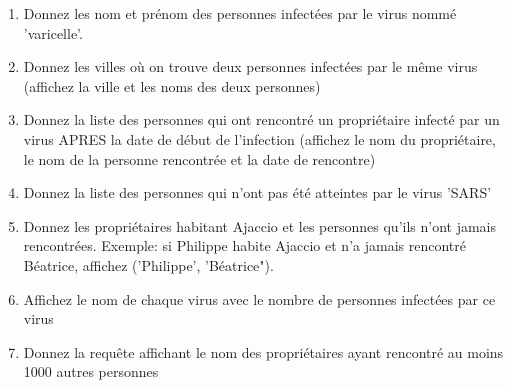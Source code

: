 \begin{enumerate}
  \item Donnez les nom et prénom des personnes infectées par le virus nommé  'varicelle'.

  \item Donnez les villes où on trouve  deux personnes
       infectées par le même virus (affichez la ville
       et les noms des deux personnes)

  \item Donnez la liste des personnes qui ont rencontré un propriétaire
      infecté par un virus APRES la date de début de l'infection
       (affichez le nom du propriétaire, le nom de la personne rencontrée
        et la date de rencontre)
   
   \item Donnez la liste des personnes qui n'ont pas été atteintes par le virus 'SARS'
  
   \item Donnez les propriétaires habitant Ajaccio et les personnes 
          qu'ils n'ont jamais rencontrées. Exemple: si Philippe habite Ajaccio
          et n'a jamais rencontré Béatrice, affichez ('Philippe', 'Béatrice").

   \item Affichez le nom de chaque virus avec le nombre de personnes
      infectées par ce virus
      
   \item Donnez la requête affichant le nom des propriétaires ayant rencontré au moins 1000 autres personnes
\end{enumerate}


